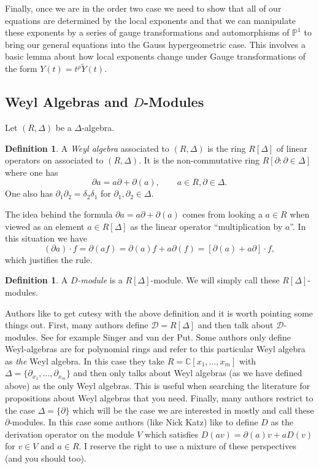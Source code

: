 \documentclass[]{book}
\numberwithin{equation}{section}
\theoremstyle{definition}
\newtheorem{definition}[theorem]{Definition}
\theoremstyle{remark}
\newcommand{\CC}{\mathbb{C}}
\newcommand{\PP}{\mathbb{P}}
\begin{document}
Finally, once we are in the order two case we need to show that all of our equations are determined by the local exponents and that we can manipulate these exponents by a series of gauge transformations and automorphisms of $\PP^1$ to bring our general equations into the Gauss hypergeometric case.
This involves a basic lemma about how local exponents change under Gauge transformations of the form $Y(t) = t^{\rho} \widetilde{Y}(t)$. 

\subsection{Weyl Algebras and $D$-Modules}

Let $(R,\Delta)$ be a $\Delta$-algebra. 
\begin{definition}
	A \emph{Weyl algebra} associated to $(R,\Delta)$ is the ring $R[\Delta]$ of linear operators on associated to $(R,\Delta)$. 
	It is the non-commutative ring $R[\partial \colon \partial \in \Delta]$ where one has
	$$ \partial a = a \partial  + \partial(a), \qquad a \in R, \partial \in \Delta.$$
	One also has $\partial_1 \partial_2 = \delta_2 \delta_1$ for $\partial_1,\partial_2 \in \Delta$.
\end{definition}

The idea behind the formula $\partial a = a \partial + \partial(a)$ comes from looking a $a \in R$ when viewed as an element $a \in R[\Delta]$ as the linear operator ``multiplication by $a$''.
In this situation we have 
$$ (\partial a) \cdot f = \partial( af) = \partial(a)f + a \partial(f) = [\partial(a) + a \partial]\cdot f,$$
which justifies the rule. 

\begin{definition}
	A \emph{$D$-module} is a $R[\Delta]$-module. 
	We will simply call these $R[\Delta]$-modules. 
\end{definition}

Authors like to get cutesy with the above definition and it is worth pointing some things out. 
First, many authors define $\mathcal{D} = R[\Delta]$ and then talk about $\mathcal{D}$-modules. See for example Singer and van der Put. 
Some authors only define Weyl-algebras are for polynomial rings and refer to this particular Weyl algebra as \emph{the} Weyl algebra. 
In this case they take $R = \CC[x_1,\ldots,x_m]$ with $\Delta = \lbrace \partial_{x_1},\ldots, \partial_{x_m} \rbrace$ and then only talks about Weyl algebras (as we have defined above) as the only Weyl algebras.
This is useful when searching the literature for propositions about Weyl algebras that you need.
Finally, many authors restrict to the case $\Delta = \lbrace \partial \rbrace$ which will be the case we are interested in mostly and call these $\partial$-modules. 
In this case some authors (like Nick Katz) like to define $D$ as the derivation operator on the module $V$ which satisfies $D(av) = \partial(a) v + a D(v)$ for $v\in V$ and $a \in R$.
I reserve the right to use a mixture of these perspectives (and you should too).
\end{document}
